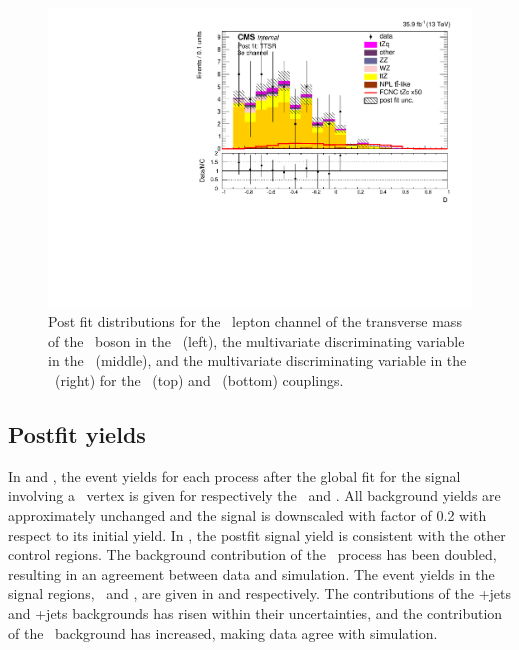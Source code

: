 \begin{figure}[htbp]
	\includegraphics[width=0.49\linewidth]{6_Search/Figures/ZctFit/shapes_fit_s_LepChan_3e_TTSR_error_trial.pdf}
	\caption{Post fit distributions for the \eee\  lepton channel of the transverse mass of the \PW\ boson in the \WZCR\ (left), the multivariate discriminating variable in the \STSR\ (middle), and the multivariate discriminating variable in the \TTSR\ (right) for the \Zut\ (top) and \Zct\ (bottom) couplings. }
	\label{fig:shapesfit3e}
\end{figure}

\clearpage
\subsection{Postfit yields}
\label{sec:postfityields}
In  and , the  event yields for each process after the global fit for the signal involving a \Zut\ vertex is given for respectively the \STCR\ and \TTCR. All background yields are approximately unchanged and the signal is downscaled with factor of 0.2 with respect to its initial yield. In , the postfit signal yield is consistent with the other control regions. The background contribution of the \NPL\ process has been doubled, resulting in an agreement between data and simulation. The event yields in the signal regions, \STSR\ and \TTSR, are given in  and  respectively. The contributions of the \WZ+jets and \ttZ+jets backgrounds has risen within their uncertainties, and the contribution of the \NPL\ background has increased, making data agree with simulation. 

